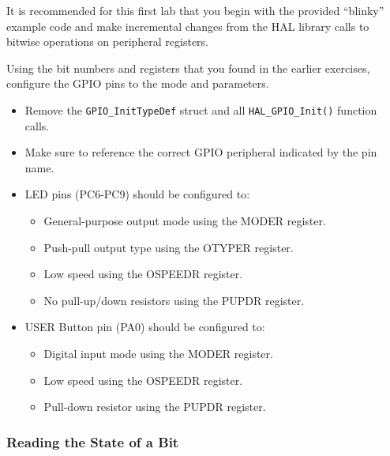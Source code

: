 \documentclass[11pt,fleqn]{book} %
\begin{document}
\newpage
\begin{exercise}
    It is recommended for this first lab that you begin with the provided ``blinky'' example code and make incremental changes from the HAL library calls to bitwise operations on peripheral registers.
    
    
    Using the bit numbers and registers that you found in the earlier exercises, configure the GPIO pins to the mode and parameters. 
    \begin{itemize}
        \item Remove the \texttt{GPIO\_InitTypeDef} struct and all \texttt{HAL\_GPIO\_Init()} function calls.
        \item Make sure to reference the correct GPIO peripheral indicated by the pin name. 
        \item LED pins (PC6-PC9) should be configured to:
        \begin{itemize}
            \item General-purpose output mode using the MODER register. 
            \item Push-pull output type using the OTYPER register.
            \item Low speed using the OSPEEDR register. 
            \item No pull-up/down resistors using the PUPDR register. 
        \end{itemize}
        \item USER Button pin (PA0) should be configured to:
        \begin{itemize}
            \item Digital input mode using the MODER register. 
            \item Low speed using the OSPEEDR register. 
            \item Pull-down resistor using the PUPDR register. 
        \end{itemize}
           
    \end{itemize}
\end{exercise}

\subsubsection{Reading the State of a Bit}
\end{document}
